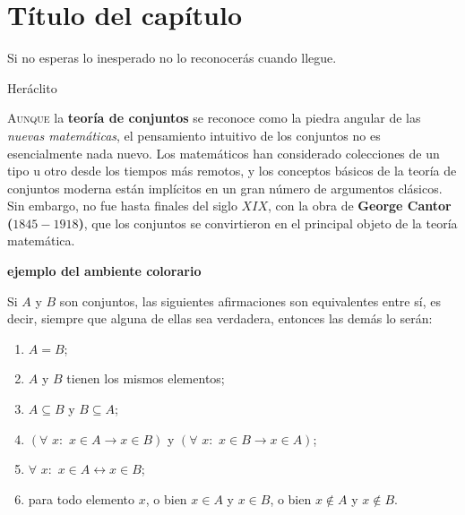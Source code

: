 \chapter{Título del capítulo}\label{cap:04}
\pagecolor{white}
\BgThispage
\thispagestyle{empty}
\pagestyle{isfodosuCD}
\epigraph{Si no esperas lo inesperado no lo reconocerás cuando llegue.}{Heráclito}

\lettrine[lraise=0, lines=4, loversize=0]{\textcolor{azulF}{A}}{unque} la \textbf{teoría de conjuntos} se reconoce como 
la piedra angular de las \textit{nuevas matemáticas}, el pensamiento intuitivo de los conjuntos no es esencialmente 
nada nuevo. Los matemáticos han considerado colecciones de un tipo u otro desde los tiempos más remotos, y los 
conceptos básicos de la teoría de conjuntos moderna están implícitos en un gran número de argumentos clásicos. Sin 
embargo, no fue hasta finales del siglo $XIX$, con la obra de \textcolor{azulF}{\textbf{George Cantor ($1845-1918$)}}, 
que los conjuntos se convirtieron en el principal objeto de la teoría matemática.

\textbf{ejemplo del ambiente colorario}

\begin{cor}[][coro:04:01] Si $A$ y $B$ son conjuntos, las siguientes afirmaciones son equivalentes entre sí, es decir, 
siempre que alguna de ellas sea verdadera, entonces las demás lo serán:
\begin{enumerate}[label=\itembolasgrises{\arabic{*}}]
 \item\label{corolario:04:01:01} $A=B$;
 \item\label{corolario:04:01:02} $A$ y $B$ tienen los mismos elementos;
 \item\label{corolario:04:01:03} $A\subseteq B$ y $B\subseteq A$;
 \item\label{corolario:04:01:04} $(\forall\,\,x:\,\,x\in A\longrightarrow x\in B)$ y $(\forall\,\,x:\,\,x\in B\longrightarrow x\in A)$;
 \item\label{corolario:04:01:05} $\forall\,\,x:\,\,x\in A\longleftrightarrow x\in B$;
 \item\label{corolario:04:01:06} para todo elemento $x$, o bien $x\in A$ y $x\in B$, o bien $x\notin A$ y $x\notin B$.
\end{enumerate}
\end{cor}

\newpage

